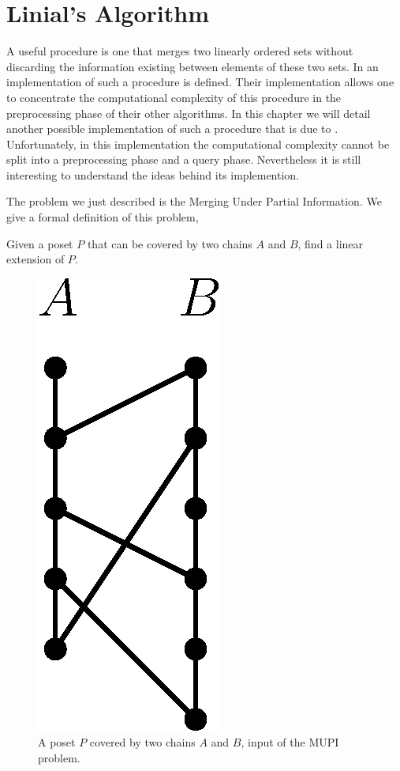 \section{Linial's Algorithm}

A useful procedure is one that merges two linearly ordered sets without
discarding the information existing between elements of these two sets. In
\citet*{cardinal:2013} an implementation of such a procedure is defined. Their
implementation allows one to concentrate the computational complexity of this
procedure in the preprocessing phase of their other algorithms. In this chapter
we will detail another possible implementation of such a procedure that is due
to \citet*{linial:1984}. Unfortunately, in this implementation the
computational complexity cannot be split into a preprocessing phase and a query
phase. Nevertheless it is still interesting to understand the ideas behind its
implemention.

The problem we just described is the Merging Under Partial Information. We
give a formal definition of this problem,

\begin{problem}
Given a poset \(P\) that can be covered by two chains \(A\) and \(B\), find a
linear extension of \(P\).
\end{problem}

\begin{figure}
\centering
\includegraphics[height=0.2\textheight]{fig/supi/mupi}
\caption{A poset \(P\) covered by two chains \(A\) and \(B\),
input of the MUPI problem.}
\label{fig:supi:mupi}
\end{figure}

